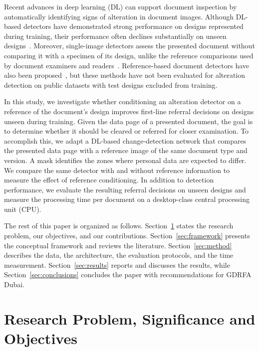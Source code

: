 \documentclass[12pt,a4paper]{article}
\begin{document}
Recent advances in deep learning (DL) can support document inspection by automatically identifying signs of alteration in document images. Although DL-based detectors have demonstrated strong performance on designs represented during training, their performance often declines substantially on unseen designs~\cite{boned2024sidtd,guan2024idnetarxiv,korshunov2025fantasyid,korshunov2025deepid}. Moreover, single-image detectors assess the presented document without comparing it with a specimen of its design, unlike the reference comparisons used by document examiners and readers~\cite{icao9303p2,regula2023templates}. Reference-based document detectors have also been proposed~\cite{ghanmi2021checksim,chen2022domain}, but these methods have not been evaluated for alteration detection on public datasets with test designs excluded from training.

In this study, we investigate whether conditioning an alteration detector on a reference of the document's design improves first-line referral decisions on designs unseen during training. Given the data page of a presented document, the goal is to determine whether it should be cleared or referred for closer examination. To accomplish this, we adapt a DL-based change-detection network that compares the presented data page with a reference image of the same document type and version. A mask identifies the zones where personal data are expected to differ. We compare the same detector with and without reference information to measure the effect of reference conditioning. In addition to detection performance, we evaluate the resulting referral decisions on unseen designs and measure the processing time per document on a desktop-class central processing unit (CPU).

The rest of this paper is organized as follows. Section~\ref{sec:problem} states the research problem, our objectives, and our contributions. Section~\ref{sec:framework} presents the conceptual framework and reviews the literature. Section~\ref{sec:method} describes the data, the architecture, the evaluation protocols, and the time measurement. Section~\ref{sec:results} reports and discusses the results, while Section~\ref{sec:conclusions} concludes the paper with recommendations for GDRFA Dubai.

\section{Research Problem, Significance and Objectives}
\label{sec:problem}
\end{document}
